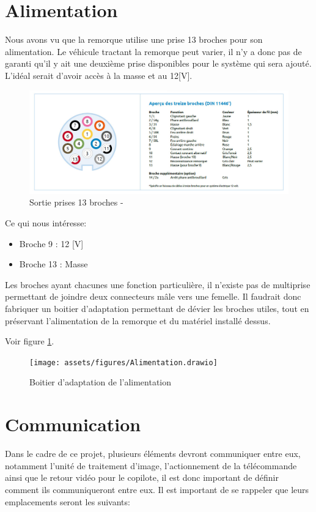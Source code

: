 \section{Alimentation}
Nous avons vu que la remorque utilise une prise 13 broches pour son alimentation. Le véhicule tractant la remorque peut varier, il n'y a donc pas de
garanti qu'il y ait une deuxième prise disponibles pour le système qui sera ajouté. L'idéal serait d'avoir accès à la masse et au 12[V].
\begin{figure}[H]
    \centering
    \includegraphics[width=14cm]{assets/figures/broches.jpg}
    \caption{Sortie prises 13 broches - \cite{prise}}
\end{figure}
Ce qui nous intéresse:
\begin{itemize}
    \item Broche 9  : 12 [V]
    \item Broche 13 : Masse
\end{itemize}
Les broches ayant chacunes une fonction particulière, il n'existe pas de multiprise permettant de joindre deux connecteurs mâle vers une femelle.
Il faudrait donc fabriquer un boitier d'adaptation permettant de dévier les broches utiles, tout en préservant l'alimentation de la remorque et du matériel installé dessus.


Voir figure \ref{alim}.
\begin{figure}[h]
    \centering
    \texttt{[image: assets/figures/Alimentation.drawio]}
    \caption{Boitier d'adaptation de l'alimentation \label{alim}}
\end{figure}
\newpage

\section{Communication}
Dans le cadre de ce projet, plusieurs éléments devront communiquer entre eux, notamment l'unité de traitement d'image,
l'actionnement de la télécommande ainsi que le retour vidéo pour le copilote, il est donc important de définir comment ils communiqueront entre eux.
Il est important de se rappeler que leurs emplacements seront les suivants:


